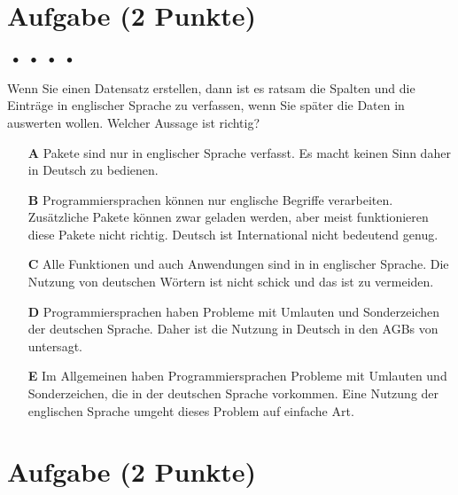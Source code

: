\documentclass[a4paper, 9pt]{scrartcl}\usepackage[]{graphicx}\usepackage[]{xcolor}
\begin{document}
\section{Aufgabe \hfill (2 Punkte)}

\ifcollection
\begin{flushright}
\tiny\vspace{-2Ex}
\textbf{\examinhaltstart}
\exammodulemathstat $\;\bullet$
\exammodulestat $\;\bullet$
\exammodulestatbbv $\;\bullet$
\exammodulestatversuch $\;\bullet$
\exammodulebiostat
\vspace{-1Ex}
\end{flushright}
\fi




Wenn Sie einen Datensatz erstellen, dann ist es ratsam die Spalten und die Einträge in englischer Sprache zu verfassen, wenn Sie später die Daten in \Rlogo auswerten wollen. Welcher Aussage ist richtig?



\begin{enumerate}
\item [\textbf{A} \msquare] \Rlogo Pakete sind nur in englischer Sprache verfasst. Es macht keinen Sinn \Rlogo daher in Deutsch zu bedienen.
\item [\textbf{B} \msquare] Programmiersprachen können nur englische Begriffe verarbeiten. Zusätzliche Pakete können zwar geladen werden, aber meist funktionieren diese Pakete nicht richtig. Deutsch ist International nicht bedeutend genug.
\item [\textbf{C} \msquare] Alle Funktionen und auch Anwendungen sind in \Rlogo in englischer Sprache. Die Nutzung von deutschen Wörtern ist nicht schick und das ist zu vermeiden.
\item [\textbf{D} \msquare] Programmiersprachen haben Probleme mit Umlauten und Sonderzeichen der deutschen Sprache. Daher ist die Nutzung in Deutsch in den AGBs von \Rlogo untersagt.
\item [\textbf{E} \msquare] Im Allgemeinen haben Programmiersprachen Probleme mit Umlauten und Sonderzeichen, die in der deutschen Sprache vorkommen. Eine Nutzung der englischen Sprache umgeht dieses Problem auf einfache Art.
\end{enumerate} 

\section{Aufgabe \hfill (2 Punkte)}
\end{document}
